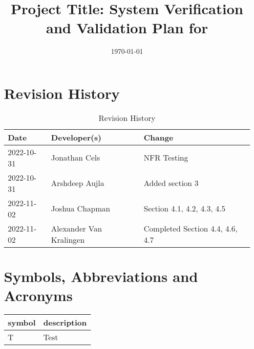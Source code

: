 \documentclass[12pt, titlepage]{article}
\begin{document}
\title{Project Title: System Verification and Validation Plan for \progname{}} 
\author{\authname}
\date{\today}
	
\maketitle


\section{Revision History}

\begin{table}[hp]
\caption{Revision History} \label{TblRevisionHistory}
\begin{tabularx}{\textwidth}{llX}
\toprule
\textbf{Date} & \textbf{Developer(s)} & \textbf{Change}\\
\midrule
2022-10-31 & Jonathan Cels & NFR Testing\\
2022-10-31 & Arshdeep Aujla & Added section 3\\
2022-11-02 & Joshua Chapman & Section 4.1, 4.2, 4.3, 4.5\\
2022-11-02 & Alexander Van Kralingen & Completed Section 4.4, 4.6, 4.7\\
\bottomrule
\end{tabularx}
\end{table}

\newpage

\tableofcontents

\listoftables
{}

\listoffigures
{}

\newpage

\section{Symbols, Abbreviations and Acronyms}

\renewcommand{\arraystretch}{1.2}
\begin{tabular}{l l} 
  \toprule		
  \textbf{symbol} & \textbf{description}\\
  \midrule 
  T & Test\\
  \bottomrule
\end{tabular}\\

\end{document}
